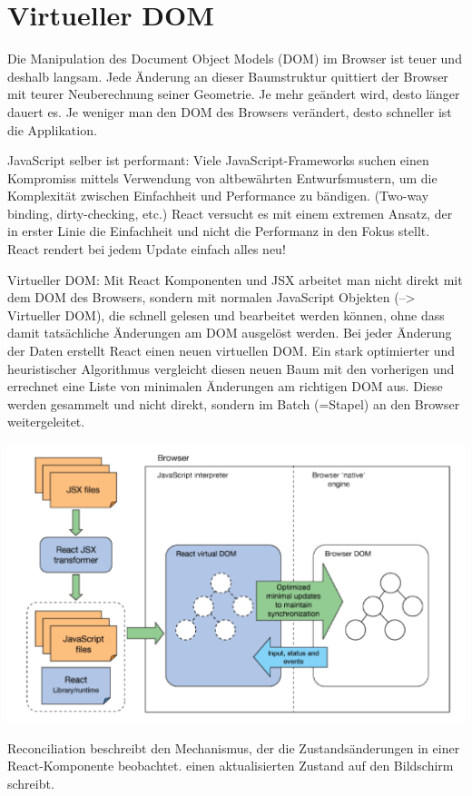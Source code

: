 \section{Virtueller DOM}
Die Manipulation des Document Object Models (DOM) im Browser ist teuer und deshalb langsam.
Jede Änderung an dieser Baumstruktur quittiert der Browser mit teurer Neuberechnung seiner Geometrie.
Je mehr geändert wird, desto länger dauert es. Je weniger man den DOM des Browsers verändert, desto schneller ist die Applikation.

JavaScript selber ist performant:
Viele JavaScript-Frameworks suchen einen Kompromiss mittels Verwendung von altbewährten Entwurfsmustern, um die Komplexität zwischen Einfachheit und Performance zu bändigen. (Two-way binding, dirty-checking, etc.)
React versucht es mit einem extremen Ansatz, der in erster Linie die Einfachheit und nicht die Performanz in den Fokus stellt. React rendert bei jedem Update einfach alles neu!

Virtueller DOM:
Mit React Komponenten und JSX arbeitet man nicht direkt mit dem DOM des Browsers, sondern mit normalen JavaScript Objekten (--> Virtueller DOM), die schnell gelesen und bearbeitet werden können, ohne dass damit tatsächliche Änderungen am DOM ausgelöst werden.
Bei jeder Änderung der Daten erstellt React einen neuen virtuellen DOM.
Ein stark optimierter und heuristischer Algorithmus vergleicht diesen neuen Baum mit den vorherigen und errechnet eine Liste von minimalen Änderungen am richtigen DOM aus.
Diese werden gesammelt und nicht direkt, sondern im Batch (=Stapel) an den Browser weitergeleitet.

\includegraphics[width=\columnwidth]{images/dom}

Reconciliation beschreibt den Mechanismus, der
die Zustandsänderungen in einer React-Komponente beobachtet.
einen aktualisierten Zustand auf den Bildschirm schreibt.

